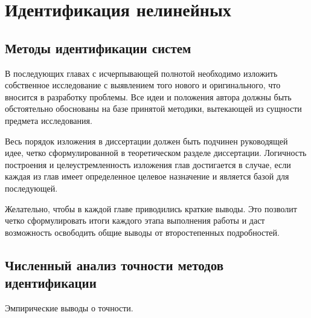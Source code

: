 \chapter{Идентификация нелинейных}

\section{Методы идентификации систем}

В последующих главах с исчерпывающей полнотой  необходимо изложить собственное исследование с выявлением того нового и оригинального, что вносится в разработку проблемы. Все идеи и положения автора должны быть обстоятельно обоснованы на базе принятой методики, вытекающей из сущности предмета исследования.

Весь порядок изложения в диссертации должен быть подчинен  руководящей идее, четко сформулированной в теоретическом разделе диссертации. Логичность построения и целеустремленность изложения  глав достигается в случае, если каждая из глав имеет определенное целевое назначение и является базой для последующей.

Желательно, чтобы в каждой главе приводились краткие выводы. Это позволит четко сформулировать итоги каждого этапа выполнения работы и даст возможность освободить общие выводы от второстепенных подробностей.

\section{Численный анализ точности методов идентификации}

Эмпирические выводы о точности.